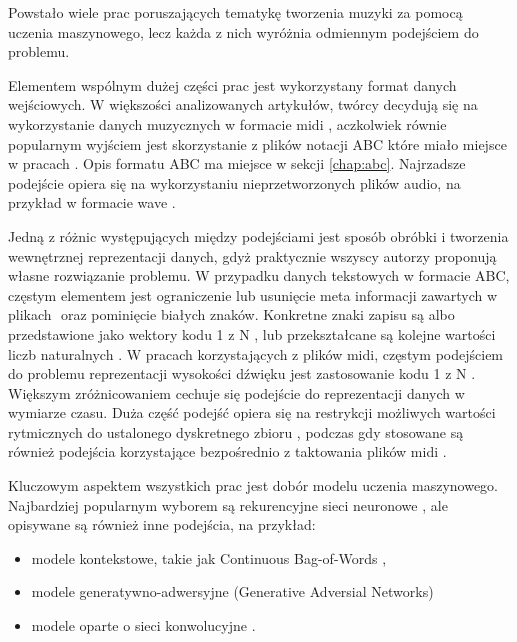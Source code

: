 {{    %
    Powstało wiele prac poruszających tematykę tworzenia muzyki za pomocą uczenia maszynowego, 
    lecz każda z\,\,nich wyróżnia odmiennym podejściem do problemu.

    Elementem wspólnym dużej części prac jest wykorzystany format danych wejściowych.
    W\,\,większości analizowanych artykułów, twórcy decydują się na wykorzystanie 
    danych muzycznych w\,\,formacie midi \cite{Hadjeres2016DeepBachAS, Mogren2016CRNNGANCR, Wu2017AHR, Yang2017MidiNetAC}, 
    aczkolwiek równie popularnym wyjściem jest skorzystanie z\,\,plików notacji ABC które miało miejsce w\,\,pracach \cite{Agarwala2017MusicCU, Sturm2015FolkMS}. 
    Opis formatu ABC ma miejsce w\,\,sekcji \ref{chap:abc}.
    Najrzadsze podejście opiera się na wykorzystaniu nieprzetworzonych plików audio, 
    na przykład w\,\,formacie wave \cite{Oord2016WaveNetAG}.
    
    Jedną z\,\,różnic występujących między podejściami jest sposób obróbki i\,\,tworzenia
    wewnętrznej reprezentacji danych, gdyż praktycznie wszyscy autorzy 
    proponują własne rozwiązanie problemu. 
    W\,\,przypadku danych tekstowych w\,\,formacie ABC, częstym elementem jest ograniczenie
    lub usunięcie meta informacji zawartych w plikach\,\,\cite{Agarwala2017MusicCU, Sturm2015FolkMS} oraz pominięcie białych znaków.
    Konkretne znaki zapisu są albo przedstawione jako wektory kodu 1 z\,\,N \cite{Sturm2015FolkMS}, 
    lub przekształcane są kolejne wartości liczb naturalnych \cite{Agarwala2017MusicCU}.
    W\,\,pracach korzystających z\,\,plików midi, częstym podejściem do problemu reprezentacji wysokości
    dźwięku jest zastosowanie kodu 1 z\,\,N \cite{Yang2017MidiNetAC}. Większym zróżnicowaniem cechuje się podejście
    do reprezentacji danych w\,\,wymiarze czasu. Duża część podejść opiera się na restrykcji możliwych
    wartości rytmicznych do ustalonego dyskretnego zbioru \cite{Hadjeres2016DeepBachAS, Wu2017AHR}, 
    podczas gdy stosowane są również podejścia korzystające bezpośrednio z\,\,taktowania 
    plików midi \cite{Mogren2016CRNNGANCR}.

    Kluczowym aspektem wszystkich prac jest dobór modelu uczenia maszynowego.
    Najbardziej popularnym wyborem są rekurencyjne sieci neuronowe \cite{Agarwala2017MusicCU, Mogren2016CRNNGANCR, Souza2018DeepNN, Sturm2015FolkMS},
    ale opisywane są również inne podejścia, na przykład:
    \begin{itemize}
      \setlength\itemsep{-0.5em}
      \item modele kontekstowe, takie jak Continuous Bag-of-Words \cite{Agarwala2017MusicCU},
      \item modele generatywno-adwersyjne (Generative Adversial Networks) \cite{Agarwala2017MusicCU, Mogren2016CRNNGANCR}
      \item modele oparte o\,\,sieci konwolucyjne \cite{Oord2016WaveNetAG, Yang2017MidiNetAC}.
    \end{itemize}

}}
